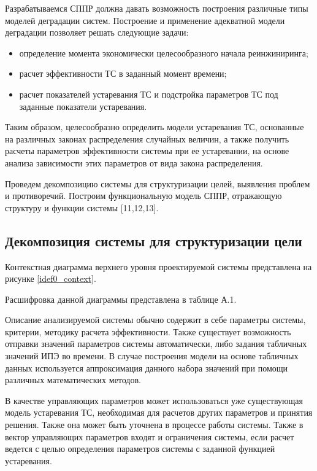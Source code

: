 Разрабатываемся СППР должна давать возможность построения различные типы моделей деградации систем. 
Построение и применение адекватной модели деградации позволяет решать следующие задачи:
\begin{itemize}
  \item определение момента экономически целесообразного начала реинжиниринга;
  \item расчет эффективности ТС в заданный момент времени;
  \item расчет показателей устаревания ТС и подстройка параметров ТС под заданные показатели устаревания.
\end{itemize}

Таким образом, целесообразно определить модели устаревания ТС, основанные на различных законах распределения случайных величин, а также получить расчеты параметров эффективности системы при ее устаревании, на основе анализа зависимости этих параметров от вида закона распределения.

Проведем декомпозицию системы для структуризации целей, выявления проблем и противоречий. 
Построим функциональную модель СППР, отражающую структуру и функции системы [11,12,13]. 

\subsection{Декомпозиция системы для структуризации цели}

Контекстная диаграмма верхнего уровня проектируемой системы представлена на рисунке \ref{idef0_context}.


Расшифровка данной диаграммы представлена в таблице А.1.

Описание анализируемой системы обычно содержит в себе параметры системы, критерии, методику расчета эффективности. 
Также существует возможность отправки значений параметров системы автоматически, либо задания табличных значений ИПЭ во времени. 
В случае построения модели на основе табличных данных используется аппроксимация данного набора значений при помощи различных математических методов.


В качестве управляющих параметров может использоваться уже существующая модель устаревания ТС, необходимая для расчетов других параметров и принятия решения. 
Также она может быть уточнена в процессе работы системы. 
Также в вектор управляющих параметров входят и ограничения системы, если расчет ведется с целью определения параметров системы с заданной функцией устаревания.

